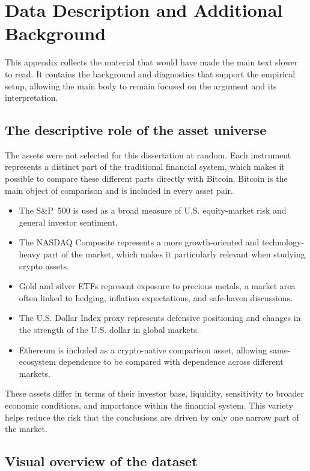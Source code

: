\section{Data Description and Additional Background}

This appendix collects the material that would have made the main text slower to read. It contains the background and diagnostics that support the empirical setup, allowing the main body to remain focused on the argument and its interpretation.

\subsection{The descriptive role of the asset universe}

The assets were not selected for this dissertation at random. Each instrument represents a distinct part of the traditional financial system, which makes it possible to compare these different parts directly with Bitcoin. Bitcoin is the main object of comparison and is included in every asset pair.

\begin{itemize}
    \item The S\&P~500 is used as a broad measure of U.S. equity-market risk and general investor sentiment.
    \item The NASDAQ Composite represents a more growth-oriented and technology-heavy part of the market, which makes it particularly relevant when studying crypto assets.
    \item Gold and silver ETFs represent exposure to precious metals, a market area often linked to hedging, inflation expectations, and safe-haven discussions.
    \item The U.S. Dollar Index proxy represents defensive positioning and changes in the strength of the U.S. dollar in global markets.
    \item Ethereum is included as a crypto-native comparison asset, allowing same-ecosystem dependence to be compared with dependence across different markets.
\end{itemize}

These assets differ in terms of their investor base, liquidity, sensitivity to broader economic conditions, and importance within the financial system. This variety helps reduce the risk that the conclusions are driven by only one narrow part of the market.

\subsection{Visual overview of the dataset}

